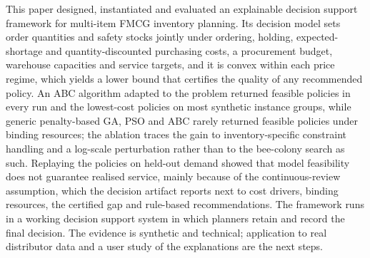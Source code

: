This paper designed, instantiated and evaluated an explainable decision support framework for multi-item FMCG inventory planning. Its decision model sets order quantities and safety stocks jointly under ordering, holding, expected-shortage and quantity-discounted purchasing costs, a procurement budget, warehouse capacities and service targets, and it is convex within each price regime, which yields a lower bound that certifies the quality of any recommended policy. An ABC algorithm adapted to the problem returned feasible policies in every run and the lowest-cost policies on most synthetic instance groups, while generic penalty-based GA, PSO and ABC rarely returned feasible policies under binding resources; the ablation traces the gain to inventory-specific constraint handling and a log-scale perturbation rather than to the bee-colony search as such. Replaying the policies on held-out demand showed that model feasibility does not guarantee realised service, mainly because of the continuous-review assumption, which the decision artifact reports next to cost drivers, binding resources, the certified gap and rule-based recommendations. The framework runs in a working decision support system in which planners retain and record the final decision. The evidence is synthetic and technical; application to real distributor data and a user study of the explanations are the next steps.
